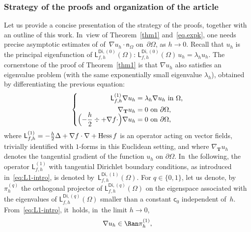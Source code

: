 \documentclass[JEP,XML,SOM,Unicode,NoEqCountersInSection,NoFloatCountersInSection,published]{cedram}
\newcommand{\mbf}[1]{\mathbf{#1}}
\let\pa\partial
\theoremstyle{plain}
\theoremstyle{definition}
\begin{document}
\subsubsection*{Strategy of the proofs and organization of the article}
Let us provide a concise presentation of the strategy of the proofs,
together with an outline of this work. In~view of Theorem~\ref{thm1} and~\eqref {eq.expk}, one needs precise
asymptotic estimates of of~$\nabla u_h\cdot \mathsf
n_\Omega$ on~$\pa\Omega$, as $h\to 0$. Recall that $u_h$ is the
principal eigenfunction of $\mathsf
L^{\mathsf{Di},(0)}_{f,h}(\Omega)$: $\mathsf L^{\mathsf{Di},(0)}_{f,h}(\Omega)\, u_h = \lambda_h u_h$. The cornerstone of the proof of
Theorem~\ref{thm1} is that $\nabla u_h$ also satisfies an eigenvalue
problem (with the same exponentially small eigenvalue $\lambda_h$), obtained by differentiating the previous equation:\vspace*{-3pt}
\begin{equation}\label{eq:L1-intro}
\left\{
\begin{aligned}
\mathsf L^{(1)}_{f,h} \nabla u_h &= \lambda_h \nabla u_h \text{ in $\Omega$,}\\
\nabla_{\mbf T} u_h& = 0 \text{ on $\partial \Omega$,}\\[-7pt]
\Bigl(-\frac{h}{2} \div + \nabla f \cdot \Bigr) \nabla u_h & = 0 \text{ on $\partial \Omega$,}\\
\end{aligned}
\right.
\end{equation}
where $
\mathsf L^{(1)}_{f,h}=- \frac{h}{2} \Delta + \nabla f \cdot \nabla + {\rm
Hess} \, f$
is an operator acting on vector fields, trivially identified with
$1$-forms in this Euclidean setting, and where $\nabla_{\mbf T}u_h$ denotes the tangential gradient of the function $u_h$ on $\partial \Omega$. In~the
following, the operator $\mathsf L^{(1)}_{f,h}$ with tangential Dirichlet
boundary conditions, as introduced in~\eqref{eq:L1-intro}, is denoted
by~$\mathsf L^{\mathsf{Di},(1)}_{f,h}(\Omega)$.
For $q\in\{0,1\}$, let us denote, by~$ \pi_h^{(q)}$ the orthogonal
projector of $\mathsf L^{\mathsf{Di},(q)}_{f,h}(\Omega)$ on the
eigenspace associated with the eigenvalues of $\mathsf
L^{\mathsf{Di},(q)}_{f,h}(\Omega)$ smaller than a constant $\mathsf
c_0$ independent of~$h$. From~\eqref{eq:L1-intro}, it~holds, in~the
limit $h \to 0$,\vspace*{-3pt}
\begin{equation}\label{eq.nu-in}
\nabla u_h\in \Ran \pi_h^{(1)},
\end{equation}
\end{document}
